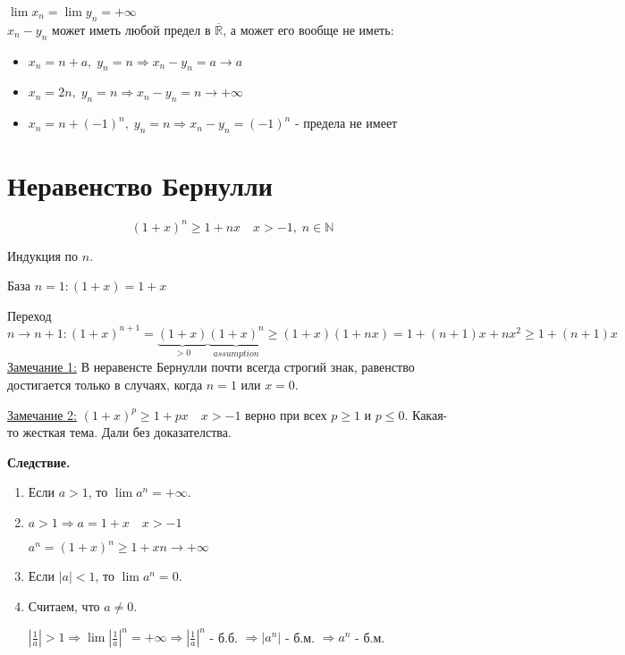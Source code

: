 \documentclass[12pt,letterpaper]{report}
\makeatletter
\theoremstyle{definition}
\renewenvironment{proof}[1][\proofname]{%
   \par\pushQED{\qed}\normalfont%
   \topsep6\p@\@plus6\p@\relax
   \trivlist\item[\hskip\labelsep\bfseries#1\@addpunct{.}]%
   \ignorespaces
}{%
   \popQED\endtrivlist\@endpefalse
}
\makeatother
\begin{document}
    $\lim x_n = \lim y_n = +\infty$ \\
    $x_n - y_n$  может иметь любой предел в $\overline{\mathbb{R}}$, а может его вообще не иметь:
    \begin{itemize}
        \item $x_n = n + a,\; y_n = n \Rightarrow x_n - y_n = a \to a$
        \item $x_n = 2n,\; y_n = n \Rightarrow x_n - y_n = n \to +\infty$
        \item $x_n = n + (-1)^n,\; y_n = n \Rightarrow x_n - y_n = (-1)^n$ - предела не имеет
    \end{itemize}
    
    \section{Неравенство Бернулли}
    \[ (1 + x)^n \geqslant 1 + nx \quad x > -1,\; n \in \mathbb{N} \]
    \begin{proof}
        Индукция по $n$.
        
        База $n = 1: (1 + x) = 1 + x$
        
        Переход $n \to n + 1: (1 + x)^{n + 1} = \underbrace{(1 + x)}_{> 0}\underbrace{(1 + x)^n}_{assumption} \geqslant (1 + x)(1 + nx) = 1 + (n + 1)x + nx^2 \geqslant 1 + (n + 1)x$
    \end{proof}
    \underline{Замечание 1:} В неравенсте Бернулли почти всегда строгий знак, равенство достигается только в случаях, когда $n = 1$ или $x = 0$.
    
    \underline{Замечание 2:} $(1 + x)^p \geqslant 1 + px \quad x > -1$ верно при всех $p \geqslant 1$ и $p \leqslant 0$. Какая-то жесткая тема. Дали без доказателства.
    \vspace{0.5cm}
    
    \textbf{Следствие.} 
    \begin{enumerate}
        \item Если $a > 1$, то $\lim a^n = +\infty$.
        \begin{proof}
            $a > 1 \Rightarrow a = 1 + x \quad x > -1$
            
            $a^n = (1 + x)^n \geqslant 1 + xn \to +\infty$
        \end{proof}
        \item Если $|a| < 1$, то $\lim a^n = 0$.
        \begin{proof}
            Считаем, что $a \neq 0$.
            
            $|\frac{1}{a}| > 1 \Rightarrow \lim |\frac{1}{a}|^n = +\infty \Rightarrow |\frac{1}{a}|^n$ - б.б. $\Rightarrow |a^n|$ - б.м. $\Rightarrow a^n$ - б.м.
        \end{proof}
    \end{enumerate}
    
\end{document}
